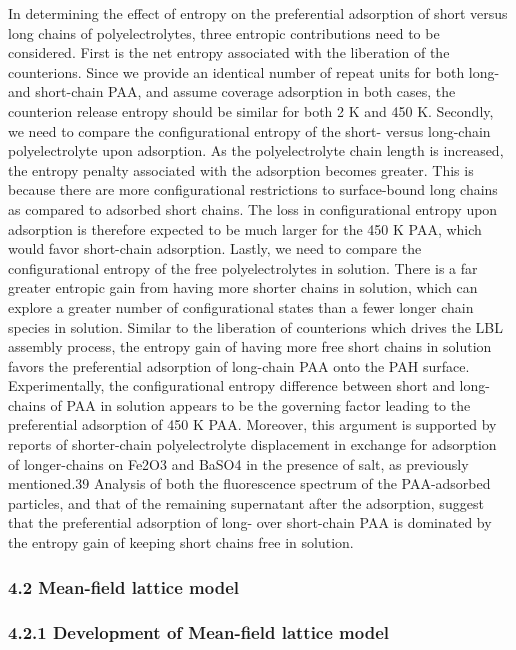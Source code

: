 \documentclass[journal=jacsat,manuscript=article]{achemso}
\begin{document}
In determining the effect of entropy on the preferential adsorption of short versus long chains of polyelectrolytes, three entropic contributions need to be considered.  First is the net entropy associated with the liberation of the counterions.  Since we provide an identical number of repeat units for both long- and short-chain PAA, and assume coverage adsorption in both cases, the counterion release entropy should be similar for both 2 K and 450 K.  Secondly, we need to compare the configurational entropy of the short- versus long-chain polyelectrolyte upon adsorption.  As the polyelectrolyte chain length is increased, the entropy penalty associated with the adsorption becomes greater.  This is because there are more configurational restrictions to surface-bound long chains as compared to adsorbed short chains.  The loss in configurational entropy upon adsorption is therefore expected to be much larger for the 450 K PAA, which would favor short-chain adsorption.  Lastly, we need to compare the configurational entropy of the free polyelectrolytes in solution.  There is a far greater entropic gain from having more shorter chains in solution, which can explore a greater number of configurational states than a fewer longer chain species in solution.  Similar to the liberation of counterions which drives the LBL assembly process, the entropy gain of having more free short chains in solution favors the preferential adsorption of long-chain PAA onto the PAH surface.  Experimentally, the configurational entropy difference between short and long-chains of PAA in solution appears to be the governing factor leading to the preferential adsorption of 450 K PAA.  Moreover, this argument is supported by reports of shorter-chain polyelectrolyte displacement in exchange for adsorption of longer-chains on Fe2O3 and BaSO4 in the presence of salt, as previously mentioned.39  Analysis of both the fluorescence spectrum of the PAA-adsorbed particles, and that of the remaining supernatant after the adsorption, suggest that the preferential adsorption of long- over short-chain PAA is dominated by the entropy gain of keeping short chains free in solution.

\subsubsection{4.2 Mean-field lattice model}

\subsubsection{4.2.1 Development of Mean-field lattice model}
\end{document}
